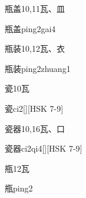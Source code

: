 \begin{Entry}{瓶盖}{10,11}{⽡、⽫}
  \begin{Phonetics}{瓶盖}{ping2gai4}
  \end{Phonetics}
\end{Entry}

\begin{Entry}{瓶装}{10,12}{⽡、⾐}
  \begin{Phonetics}{瓶装}{ping2zhuang1}
  \end{Phonetics}
\end{Entry}

\begin{Entry}{瓷}{10}{⽡}
  \begin{Phonetics}{瓷}{ci2}[][HSK 7-9]
  \end{Phonetics}
\end{Entry}

\begin{Entry}{瓷器}{10,16}{⽡、⼝}
  \begin{Phonetics}{瓷器}{ci2qi4}[][HSK 7-9]
  \end{Phonetics}
\end{Entry}

\begin{Entry}{甁}{12}{⽡}
  \begin{Phonetics}{甁}{ping2}
  \end{Phonetics}
\end{Entry}


